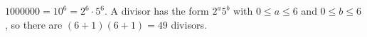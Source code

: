 $1000000=10^6=2^6\cdot5^6$. A divisor has the form $2^a5^b$ with $0\le a\le6$ and $0\le b\le6$, so there are $(6+1)(6+1)=\boxed{49}$ divisors.
